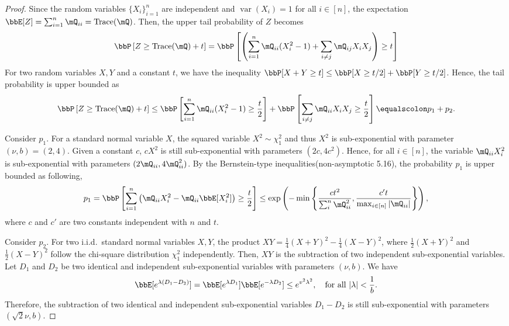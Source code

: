 \documentclass[11pt]{article}
\DeclareMathOperator{\var}{var}
\DeclareMathOperator{\tr}{Trace}
\newcommand{\of}[1]{\left(#1\right)}
\newcommand{\off}[1]{\left[#1\right]}
\newcommand{\offf}[1]{\left\{#1\right\}}
\theoremstyle{plain}
\theoremstyle{definition}
\begin{document}
    \begin{proof}
    	Since the random variables $\{X_i\}_{i=1}^n$ are independent and $\var(X_i) = 1$ for all $i \in [n]$, the expectation $\bbE[Z] = \sum_{i = 1}^{n} \mQ_{ii} = \tr(\mQ)$. Then, the upper tail probability of $Z$ becomes
    	\begin{equation}
    		\bbP \off{ Z \geq \tr(\mQ) +  t } = \bbP \off{ \of{  \sum_{i = 1}^{n} \mQ_{ii} (X^2_i - 1) + \sum_{i \neq j} \mQ_{ij} X_i X_j }\geq t   }
    	\end{equation}
    	For two random variables $X,Y$ and a constant $t$, we have the inequality $ \bbP[X+Y \geq t] \leq \bbP[X \geq t/2] + \bbP[Y \geq t/2]$. Hence, the tail probability is upper bounded as
    	\begin{equation}
    		\bbP \off{ Z \geq \tr(\mQ) +  t } \leq \bbP\off{ \sum_{i =1 }^n \mQ_{ii}(X_i^2 - 1) \geq \frac{t}{2}  } + \bbP \off{ \sum_{i \neq j} \mQ_{ii} X_i X_j  \geq \frac{t}{2}} \equalscolon p_1 + p_2.
    	\end{equation} 
    	
    	Consider $p_1$. For a standard normal variable $X$,  the squared variable $X^2 \sim \chi^2_1$ and thus $X^2$ is sub-exponential with parameter $(\nu, b) = (2,4)$. Given a constant $c$, $cX^2$ is still sub-exponential with parameters $(2 c, 4 c^2)$. Hence, for all $i \in [n]$, the variable $\mQ_{ii} X_i^2$ is sub-exponential with parameters $(2 \mQ_{ii}, 4 \mQ^2_{ii} )$. By the Bernstein-type inequalities(non-asymptotic 5.16), the probability $p_1$ is upper bounded as following,
    	\begin{equation}
    		p_1 = \bbP \off{\sum_{i=1}^n { \of{ \mQ_{ii}X^2_i - \mQ_{ii}\bbE[X^2_i]   } \geq \frac{t}{2} }} \leq \exp \of{ - \min \offf{  \frac{c t^2}{\sum_{i}^n \mQ^2_{ii} }, \frac{c't}{\max_{i \in [n]  }|\mQ_{ii}| } }},
    	\end{equation}
    	where $c$ and $c'$ are two constants independent with $n$ and $t$.
    	
    	\vspace{0.2cm}
    	
    	Consider $p_2$. For two i.i.d.\ standard normal variables $X,Y$, the product $XY = \frac{1}{4}(X+Y)^2 - \frac{1}{4}(X-Y )^2$, where $ \frac{1}{2} (X+Y)^2$ and $\frac{1}{2} (X-Y)^2$ follow the chi-square distribution $\chi^2_1$ independently. Then, $XY$ is the subtraction of two independent sub-exponential variables. Let $D_1$ and $D_2$ be two identical and independent sub-exponential variables with parameters $(\nu, b)$. We have
    	\[ \bbE[e^{\lambda (D_1-D_2)}] = \bbE[e^{\lambda D_1}] \bbE[e^{-\lambda D_2}] \leq e^{v^2 \lambda^2}, \quad \text{for all } |\lambda | < \frac{1}{b}.  \]
    	Therefore, the subtraction of two identical and independent sub-exponential variables $D_1 -D_2$ is still sub-exponential with parameters $(\sqrt{2}\nu, b)$.
    	

\end{proof}
\end{document}
